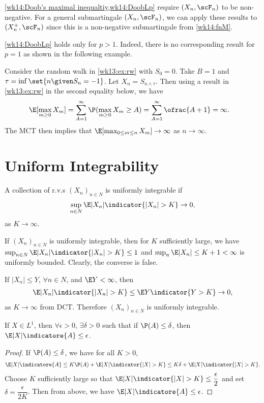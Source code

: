 \documentclass[../aipt.tex]{subfiles}
\begin{document}
\cref{wk14:Doob's maximal inequaltiy,wk14:DoobLp} require $(X_n,\scF_n)$ to be non-negative. For a general submartingale $(X_n,\scF_n)$, we can apply these results to $(X_n^+, \scF_n)$ since this is a non-negative submartingale from \cref{wk14:fnM}.

\cref{wk14:DoobLp} holds only for $p>1$. Indeed, there is no corresponding result for $p=1$ as shown in the following example.

\begin{Example}
Consider the random walk in \cref{wk13:ex:rw} with $S_0=0$. Take $B=1$ and $\tau=\inf\set{n\given S_n=-1}$. Let $X_n = S_{n\wedge \tau}$. Then using a result in \cref{wk13:ex:rw} in the second equality below, we have
\begin{align*}
& \E[\max_{m\geq0} X_m] = \sum_{A=1}^\infty \P(\max_{m\geq0} X_m \geq A) = \sum_{A=1}^\infty \ofrac{A+1}=\infty.
\end{align*}
The MCT then implies that $\E[\max_{0\leq m \leq n} X_m] \to \infty$ as $n\to\infty$.
\end{Example}

\section{Uniform Integrability}

\begin{Definition}
A collection of r.v.s $(X_n)_{n\in N}$ is uniformly integrable if
\begin{align}
\sup_{n\in N} \E |X_n|\indicator{|X_n|>K} \to 0, 
\end{align}
as $K\to\infty$.
\end{Definition}
If $(X_n)_{n\in N}$ is uniformly integrable, then for $K$ sufficiently large, we have $\sup_{n\in N} \E |X_n|\indicator{|X_n|>K}\leq 1$ and $\sup_n \E|X_n| \leq K+1 <\infty$ is uniformly bounded. Clearly, the converse is false.

\begin{Example}
If $|X_n|\leq Y$, $\forall n\in N$, and $\E Y <\infty$, then 
\begin{align*}
\E|X_n|\indicator{|X_n|>K} \leq \E Y\indicator{Y > K} \to 0,
\end{align*}
as $K\to\infty$ from DCT. Therefore $(X_n)_{n\in N}$ is uniformly integrable.
\end{Example}

\begin{Lemma}\label{wk14:ABound}
If $X \in L^1$, then $\forall\epsilon>0$, $\exists\delta>0$ such that if $\P(A)\leq\delta$, then $\E|X|\indicatore{A} \leq \epsilon$.
\end{Lemma}
\begin{proof}
If $\P(A)\leq\delta$, we have for all $K>0$,
\begin{align*}
\E|X|\indicatore{A} \leq K\P(A) + \E|X|\indicator{|X|>K} \leq K\delta + \E|X|\indicator{|X|>K}.
\end{align*}
Choose $K$ sufficiently large so that $\E|X|\indicator{|X|>K}\leq \dfrac{\epsilon}{2}$ and set $\delta=\dfrac{\epsilon}{2K}$. Then from above, we have $\E|X|\indicatore{A} \leq \epsilon$.
\end{proof}
\end{document}
